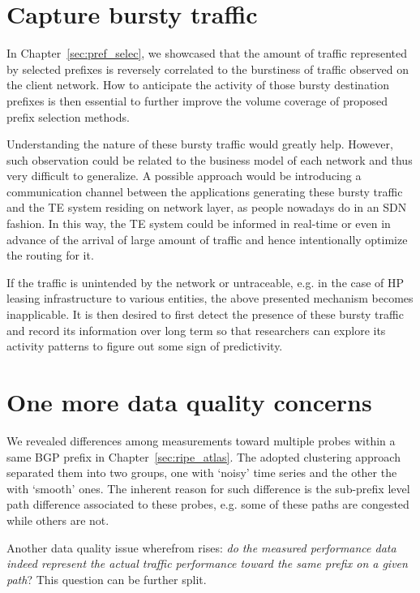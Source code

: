 \section{Capture bursty traffic}
In Chapter~\ref{sec:pref_selec}, we showcased that the amount of traffic represented by selected prefixes is reversely correlated to the burstiness of traffic observed on the client network. How to anticipate the activity of those bursty destination prefixes is then essential to further improve the volume coverage of proposed prefix selection methods.

Understanding the nature of these bursty traffic would greatly help. However, such observation could be related to the business model of each network and thus very difficult to generalize. A possible approach would be introducing a communication channel between the applications generating these bursty traffic and the TE system residing on network layer, as people nowadays do in an \ac{SDN} fashion. In this way, the TE system could be informed in real-time or even in advance of the arrival of large amount of traffic and hence intentionally optimize the routing for it.

If the traffic is unintended by the network or untraceable, e.g. in the case of \ac{HP} leasing infrastructure to various entities, the above presented mechanism becomes inapplicable. It is then desired to first detect the presence of these bursty traffic and record its information over long term so that researchers can explore its activity patterns to figure out some sign of predictivity.

\section{One more data quality concerns}
We revealed differences among measurements toward multiple probes within a same BGP prefix in Chapter~\ref{sec:ripe_atlas}. The adopted clustering approach separated them into two groups, one with `noisy' time series and the other the with `smooth' ones. The inherent reason for such difference is the sub-prefix level path difference associated to these probes, e.g. some of these paths are congested while others are not.

Another data quality issue wherefrom rises: \textit{do the measured performance data indeed represent the actual traffic performance toward the same prefix on a given path}?
This question can be further split. 

